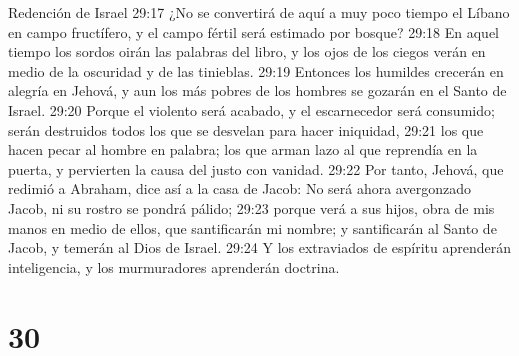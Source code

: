 Redención de Israel  
29:17 ¿No se convertirá de aquí a muy poco tiempo el Líbano en campo fructífero, y el campo fértil será estimado por bosque?  
29:18 En aquel tiempo los sordos oirán las palabras del libro, y los ojos de los ciegos verán en medio de la oscuridad y de las tinieblas.  
29:19 Entonces los humildes crecerán en alegría en Jehová, y aun los más pobres de los hombres se gozarán en el Santo de Israel.  
29:20 Porque el violento será acabado, y el escarnecedor será consumido; serán destruidos todos los que se desvelan para hacer iniquidad,  
29:21 los que hacen pecar al hombre en palabra; los que arman lazo al que reprendía en la puerta, y pervierten la causa del justo con vanidad.  
29:22 Por tanto, Jehová, que redimió a Abraham, dice así a la casa de Jacob: No será ahora avergonzado Jacob, ni su rostro se pondrá pálido;  
29:23 porque verá a sus hijos, obra de mis manos en medio de ellos, que santificarán mi nombre; y santificarán al Santo de Jacob, y temerán al Dios de Israel.  
29:24 Y los extraviados de espíritu aprenderán inteligencia, y los murmuradores aprenderán doctrina.  

\chapter{30}


